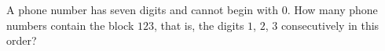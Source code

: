 A phone number has seven digits and cannot begin with $0$. How many phone numbers contain the block $123$, that is, the digits $1$, $2$, $3$ consecutively in this order?
